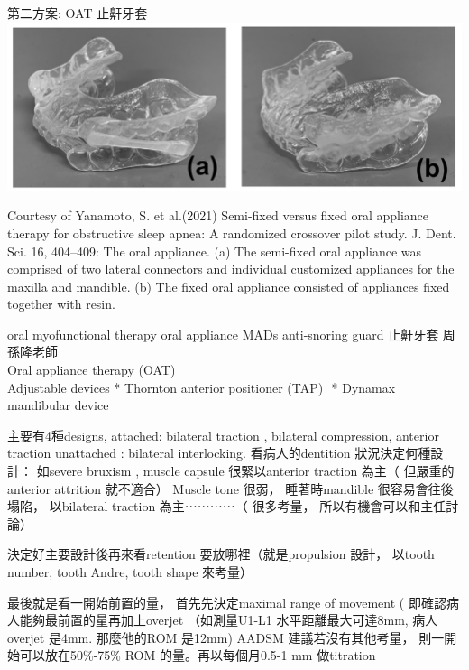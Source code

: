 \documentclass[aspectratio=169]{beamer}
\begin{document}
\begin{frame}{第二方案: OAT 止鼾牙套}
\centering
\includegraphics[height=0.30\textwidth]{Yanamoto2021.jpg}
\par Courtesy of Yanamoto, S. et al.(2021) Semi-fixed versus fixed oral appliance therapy for obstructive sleep apnea: A randomized crossover pilot study. J. Dent. Sci. 16, 404–409: The oral appliance. (a) The semi-fixed oral appliance was comprised of two lateral connectors and individual customized appliances for the maxilla and mandible. (b) The fixed oral appliance consisted of appliances fixed together with resin.


\begin{block}

oral myofunctional therapy
oral appliance MADs
    anti-snoring guard 止鼾牙套 周孫隆老師\\
    Oral appliance therapy (OAT)\\
Adjustable devices
* Thornton anterior positioner (TAP) 
* Dynamax mandibular device

    主要有4種designs, 
attached: bilateral traction , bilateral compression, anterior traction 
unattached : bilateral interlocking. 
看病人的dentition 狀況決定何種設計： 如severe bruxism , muscle capsule 很緊以anterior traction 為主（ 但嚴重的anterior attrition 就不適合） 
Muscle tone 很弱， 睡著時mandible 很容易會往後塌陷， 以bilateral traction 為主⋯⋯⋯⋯（ 很多考量， 所以有機會可以和主任討論） 

決定好主要設計後再來看retention 要放哪裡（就是propulsion 設計， 以tooth number, tooth Andre, tooth shape 來考量） 

最後就是看一開始前置的量， 首先先決定maximal range of movement ( 即確認病人能夠最前置的量再加上overjet （如測量U1-L1 水平距離最大可達8mm, 病人overjet 是4mm. 那麼他的ROM 是12mm) 
AADSM 建議若沒有其他考量， 則一開始可以放在50\%-75\% ROM 的量。再以每個月0.5-1 mm 做titration
\end{block}

\end{frame}
\end{document}
